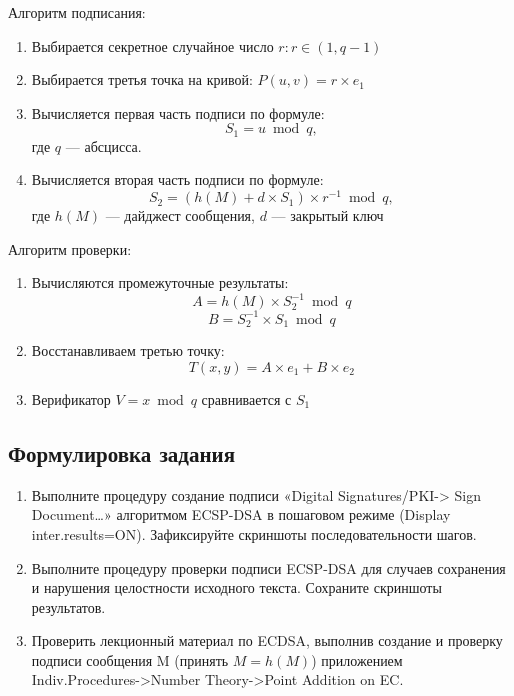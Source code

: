 \documentclass[a4paper, 14pt]{extarticle}
\begin{document}
Алгоритм подписания:
\begin{enumerate}
    \item Выбирается секретное случайное число $r: r \in (1, q - 1)$
    \item Выбирается третья точка на кривой: $P(u, v) = r \times e_1$
    \item Вычисляется первая часть подписи по формуле:
    \begin{equation*}
        S_1 = u \bmod q,
    \end{equation*}
    где $q$ --- абсцисса.
    \item Вычисляется вторая часть подписи по формуле:
    \begin{equation*}
        S_2 = (h(M) + d \times S_1) \times r^{-1} \bmod q,
    \end{equation*}
    где $h(M)$ --- дайджест сообщения, $d$ --- закрытый ключ\\
\end{enumerate}

Алгоритм проверки:
\begin{enumerate}
    \item Вычисляются промежуточные результаты:
    \begin{equation*}
        A = h(M) \times S_2^{-1} \bmod q
    \end{equation*}
    \begin{equation*}
        B = S_2^{-1} \times S_1 \bmod q
    \end{equation*}
    \item Восстанавливаем третью точку:
    \begin{equation*}
        T(x,y) = A \times e_1 + B \times e_2
    \end{equation*}
    \item Верификатор $V = x \bmod q$ сравнивается с $S_1$
\end{enumerate}

\subsection{Формулировка задания}
\begin{enumerate}
    \item Выполните процедуру создание подписи «Digital Signatures/PKI-> Sign Document…» алгоритмом ECSP-DSA в пошаговом режиме (Display inter.results=ON). Зафиксируйте скриншоты последовательности шагов.
    \item Выполните процедуру проверки подписи ECSP-DSA для случаев сохранения и нарушения целостности исходного текста. Сохраните скриншоты результатов.
    \item Проверить лекционный материал по ECDSA, выполнив создание и проверку подписи сообщения M (принять $M=h(M)$) приложением Indiv.Procedures->Number Theory->Point Addition on EC.\@
\end{enumerate}
\end{document}
